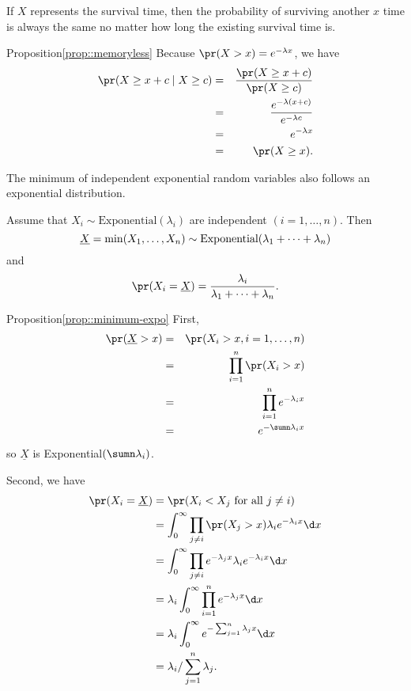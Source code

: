 If $X$ represents the survival time, then the probability of surviving another $x$ time is always the same no matter how long the existing survival time is. 

\begin{myproof}{Proposition}{\ref{prop::memoryless}}
Because $\pr(X>x) = e^{-\lambda x}$, we have 
\begin{eqnarray*}
\pr(X \geq x+c \mid X\geq c) 
&=& \frac{  \pr(X \geq x+c) }{ \pr(X \geq c) }   \\
&=& \frac{e^{-\lambda (x + c)}}{ e^{-\lambda c} } \\
&=& e^{-\lambda x} \\
&=& \pr(X \geq x).
\end{eqnarray*}
\end{myproof}



The minimum of independent exponential random variables also follows an exponential distribution. 

\begin{proposition}
\label{prop::minimum-expo}
Assume that $X_{i}\sim\text{Exponential}(\lambda_{i})$ are independent $(i=1,\ldots,n)$. Then
$$
\underline{X} = \min(X_{1},\ldots,X_{n} ) \sim  \textup{Exponential}(  \lambda_{1}+\cdots+\lambda_{n}  )
$$
and
\[
\pr (X_{i}=\underline{X}  ) =\frac{\lambda_{i}}{\lambda_{1}+\cdots+\lambda_{n}}.
\]
\end{proposition}


\begin{myproof}{Proposition}{\ref{prop::minimum-expo}}
First, 
\begin{eqnarray*}
\pr(\underline{X} > x) 
&=& \pr(X_i > x, i=1,\ldots, n) \\ 
&=& \prod_{i=1}^n \pr(X_i > x) \\
&=&  \prod_{i=1}^n e^{-\lambda_i x} \\
&=& e^{-\sumn \lambda_i x} 
\end{eqnarray*}
so $\underline{X}$ is Exponential$(\sumn \lambda_i)$.

Second, we have 
\begin{align*}
\pr(  X_{i}=\underline{X}  )   & =\pr(X_{i}<X_{j}\text{ for all }j\neq i)\\
 & =\int_{0}^{\infty}\prod_{j\neq i}\pr(X_{j}>x)\lambda_{i}e^{-\lambda_{i}x}\d x\\
 & =\int_{0}^{\infty}\prod_{j\neq i}e^{-\lambda_{j}x}\lambda_{i}e^{-\lambda_{i}x}\d x\\
 & =\lambda_{i}\int_{0}^{\infty}\prod_{i=1}^n e^{-\lambda_{j}x}\d x\\
 & =\lambda_{i}\int_{0}^{\infty}e^{-\sum_{j=1}^n\lambda_{j}x}\d x\\
 & =\lambda_{i}/\sum_{j=1}^n\lambda_{j}.
\end{align*}
\end{myproof}


